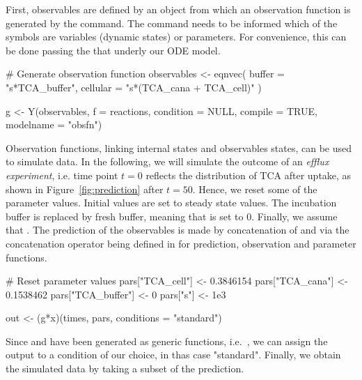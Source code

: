 \documentclass[article]{jss}
\begin{document}
First, observables are defined by an  object from which an observation function  is generated by the  command. The  command needs to be informed which of the symbols are variables (dynamic states) or parameters. For convenience, this can be done passing the  that underly our ODE model.
\begin{CodeChunk}
\begin{CodeInput}
# Generate observation function
observables <- eqnvec(
  buffer = "s*TCA_buffer",
  cellular = "s*(TCA_cana + TCA_cell)"
)

g <- Y(observables, f = reactions, condition = NULL,
       compile = TRUE, modelname = "obsfn")

\end{CodeInput}
\end{CodeChunk}
Observation functions, linking internal states and observables states, can be used to simulate data. In the following, we will simulate the outcome of an \textit{efflux experiment}, i.e. time point $t = 0$ reflects the distribution of TCA after uptake, as shown in Figure~\ref{fig:prediction} after $t = 50$. Hence, we reset some of the parameter values. Initial values are set to steady state values. The incubation buffer is replaced by fresh buffer, meaning that  is set to 0. Finally, we assume that . The prediction of the observables is made by concatenation of  and  via the concatenation operator  being defined in  for prediction, observation and parameter functions.
\begin{CodeChunk}
\begin{CodeInput}
# Reset parameter values
pars["TCA_cell"] <- 0.3846154
pars["TCA_cana"] <- 0.1538462
pars["TCA_buffer"] <- 0
pars["s"] <- 1e3

out <- (g*x)(times, pars, conditions = "standard")
\end{CodeInput}
\end{CodeChunk}
Since  and  have been generated as generic functions, i.e.~, we can assign the output to a condition of our choice, in thas case "standard".
Finally, we obtain the simulated data by taking a subset of the prediction. 
\end{document}

